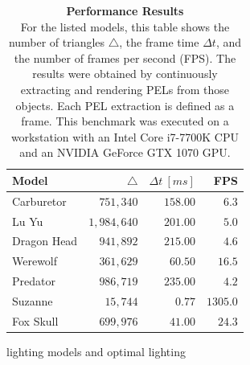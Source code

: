 \documentclass[9pt,fleqn,twoside,twocolumn]{stdglobal}
\begin{document}
    \begin{table}[h]
      \caption{%
        \textbf{Performance Results}\\
        For the listed models, this table shows the number of triangles $\triangle$, the frame time $\Delta t$, and the number of frames per second (FPS).
        The results were obtained by continuously extracting and rendering PELs from those objects.
        Each PEL extraction is defined as a frame.
        This benchmark was executed on a workstation with an
        \textrm{Intel Core i7-7700K} CPU and an
        \textrm{NVIDIA GeForce GTX 1070} GPU.
      }
      \centering
      \footnotesize
      \renewcommand{\arraystretch}{1.2}
      \begin{tabular}{lrrr}
        \hline
        \textbf{Model} & $\triangle$ & $\Delta t\ [ms]$ & \textbf{FPS} \\
        \hline
        \hline
        \rowcolor{mathdefback}
        Carburetor & $751,340$ & $158.00$ & $6.3$ \\
        Lu Yu & $1,984,640$ & $201.00$ & $5.0$ \\
        \rowcolor{mathdefback}
        Dragon Head & $941,892$ & $215.00$ & $4.6$ \\
        Werewolf & $361,629$ & $60.50$ & $16.5$ \\
        \rowcolor{mathdefback}
        Predator & $986,719$ & $235.00$ & $4.2$ \\
        Suzanne & $15,744$ & $0.77$ & $1305.0$ \\
        \rowcolor{mathdefback}
        Fox Skull & $699,976$ & $41.00$ & $24.3$ \\
        \hline
      \end{tabular}
    \end{table}

  lighting models and optimal lighting
\end{document}
